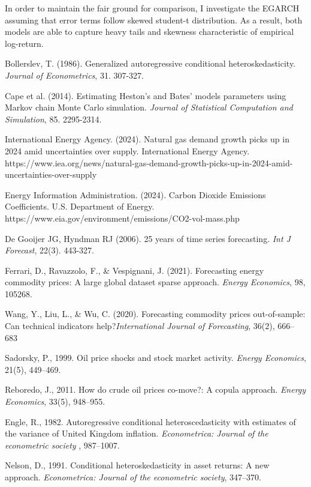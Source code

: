 \documentclass[12pt,a4paper]{article}
\numberwithin{equation}{section}
\begin{document}
In order to maintain the fair ground for comparison, I investigate the EGARCH assuming that error terms follow skewed student-t distribution. As a result, both models are able to capture heavy tails and skewness characteristic of empirical log-return. 


\newpage
\begin{thebibliography}{11}
\bibitem{}
Bollerslev, T. (1986). Generalized autoregressive conditional heteroskedasticity.  \emph{Journal of Econometrics}, 31. 307-327.

\bibitem{}
Cape et al. (2014). Estimating Heston's and Bates’ models parameters using Markov chain Monte Carlo simulation.  \emph{Journal of Statistical Computation and Simulation}, 85. 2295-2314.

\bibitem{}
International Energy Agency. (2024). Natural gas demand growth picks up in 2024 amid uncertainties over supply. International Energy Agency. https://www.iea.org/news/natural-gas-demand-growth-picks-up-in-2024-amid-uncertainties-over-supply

\bibitem{}
Energy Information Administration. (2024). Carbon Dioxide Emissions Coefficients. U.S. Department of Energy. https://www.eia.gov/environment/emissions/CO2-vol-mass.php


\bibitem{}

De Gooijer JG, Hyndman RJ (2006). 25 years of time series forecasting. \emph{Int J Forecast}, 22(3). 443-327.


\bibitem{}
Ferrari, D., Ravazzolo, F., \& Vespignani, J. (2021). Forecasting energy commodity prices: A large global dataset sparse approach. \emph{Energy Economics}, 98, 105268.


\bibitem{}
Wang, Y., Liu, L., \& Wu, C. (2020). Forecasting commodity prices out-of-sample: Can technical indicators help?\emph{International Journal of Forecasting}, 36(2), 666–683

\bibitem{}
Sadorsky, P., 1999. Oil price shocks and stock market activity. \emph{Energy Economics}, 21(5), 449–469.

\bibitem{}
Reboredo, J., 2011. How do crude oil prices co-move?: A copula approach. \emph{Energy Economics}, 33(5), 948–955.

\bibitem{}
Engle, R., 1982. Autoregressive conditional heteroscedasticity with estimates of the variance of United Kingdom inflation. \emph{Econometrica: Journal of the econometric society} , 987–1007.

\bibitem{}
Nelson, D., 1991. Conditional heteroskedasticity in asset returns: A new approach. \emph{Econometrica: Journal of the econometric society}, 347–370.


\end{thebibliography}
\end{document}

